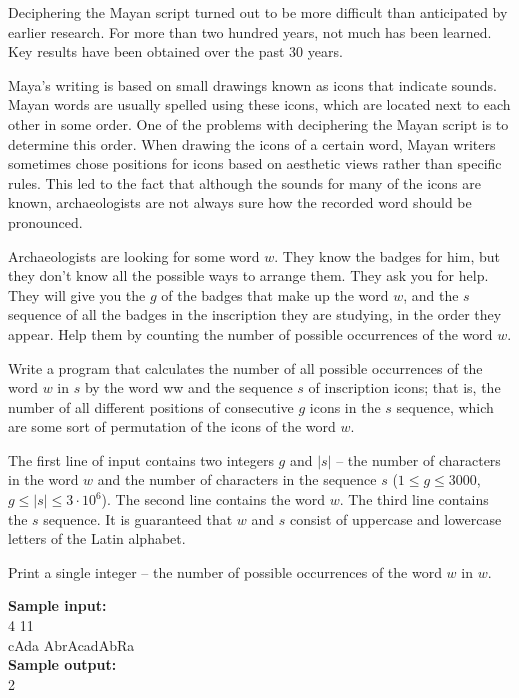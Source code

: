 \documentclass[a4paper]{article}
\begin{document}
Deciphering the Mayan script turned out to be more difficult than anticipated by earlier research. For more than two hundred years, not much has been learned. Key results have been obtained over the past 30 years.

Maya's writing is based on small drawings known as icons that indicate sounds. Mayan words are usually spelled using these icons, which are located next to each other in some order. One of the problems with deciphering the Mayan script is to determine this order. When drawing the icons of a certain word, Mayan writers sometimes chose positions for icons based on aesthetic views rather than specific rules. This led to the fact that although the sounds for many of the icons are known, archaeologists are not always sure how the recorded word should be pronounced.

Archaeologists are looking for some word $w$. They know the badges for him, but they don’t know all the possible ways to arrange them. They ask you for help. They will give you the $g$ of the badges that make up the word $w$, and the $s$ sequence of all the badges in the inscription they are studying, in the order they appear. Help them by counting the number of possible occurrences of the word $w$.

Write a program that calculates the number of all possible occurrences of the word $w$ in $s$ by the word ww and the sequence $s$ of inscription icons; that is, the number of all different positions of consecutive $g$  icons in the $s$ sequence, which are some sort of permutation of the icons of the word $w$.

The first line of input contains two integers $g$ and $|s|$ -- the number of characters in the word $w$ and the number of characters in the sequence $s$ ($1 \le g \le 3000$, $g \le |s| \le 3 \cdot 10^6$). The second line contains the word $w$. The third line contains the $s$ sequence. It is guaranteed that $w$ and $s$ consist of uppercase and lowercase letters of the Latin alphabet.

Print a single integer -- the number of possible occurrences of the word $w$ in $w$.

\LINE

\noindent \textbf{Sample input:}\\
4 11\\
cAda
AbrAcadAbRa\\


\noindent \textbf{Sample output:}\\
2
\end{document}
